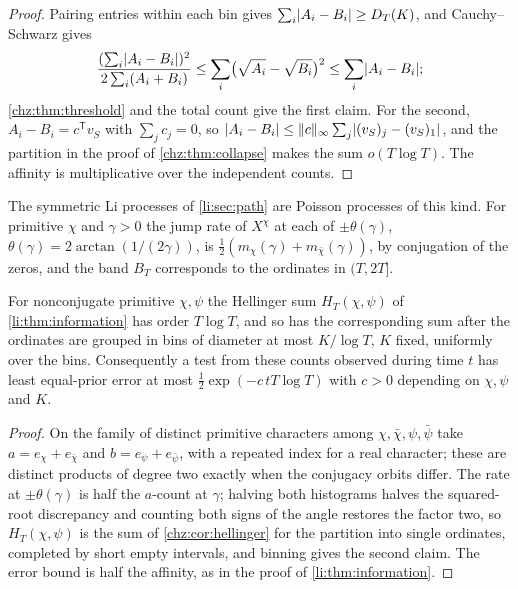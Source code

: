 \begin{proof}
Pairing entries within each bin gives $\sum_i\lvert A_i-B_i\rvert\ge D_T(K)$, and Cauchy--Schwarz gives
\[
 \frac{(\sum_i\lvert A_i-B_i\rvert)^2}{2\sum_i(A_i+B_i)}\le\sum_i\bigl(\sqrt{A_i}-\sqrt{B_i}\bigr)^2\le\sum_i\lvert A_i-B_i\rvert;
\]
\cref{chz:thm:threshold} and the total count give the first claim. For the second, $A_i-B_i=c^{\mathsf T}v_S$ with
$\sum_jc_j=0$, so $\lvert A_i-B_i\rvert\le\lVert c\rVert_\infty\sum_j\lvert(v_S)_j-(v_S)_1\rvert$, and the partition in the proof of
\cref{chz:thm:collapse} makes the sum $o(T\log T)$. The affinity is multiplicative over the independent counts.
\end{proof}

The symmetric Li processes of \cref{li:sec:path} are Poisson processes of this kind. For primitive $\chi$ and
$\gamma>0$ the jump rate of $X^\chi$ at each of $\pm\theta(\gamma)$, $\theta(\gamma)=2\arctan(1/(2\gamma))$, is
$\tfrac12(m_\chi(\gamma)+m_{\bar\chi}(\gamma))$, by conjugation of the zeros, and the band $B_T$ corresponds to the ordinates
in $(T,2T]$.

\begin{corollary}\label{chz:cor:lihellinger}
For nonconjugate primitive $\chi,\psi$ the Hellinger sum $H_T(\chi,\psi)$ of \cref{li:thm:information} has order
$T\log T$, and so has the corresponding sum after the ordinates are grouped in bins of diameter at most $K/\log T$,
$K$ fixed, uniformly over the bins. Consequently a test from these counts observed during time $t$ has least
equal-prior error at most $\tfrac12\exp(-c\,tT\log T)$ with $c>0$ depending on $\chi,\psi$ and $K$.
\end{corollary}

\begin{proof}
On the family of distinct primitive characters among $\chi,\bar\chi,\psi,\bar\psi$ take $a=e_\chi+e_{\bar\chi}$ and
$b=e_\psi+e_{\bar\psi}$, with a repeated index for a real character; these are distinct products of degree two
exactly when the conjugacy orbits differ. The rate at $\pm\theta(\gamma)$ is half the $a$-count at $\gamma$; halving both
histograms halves the squared-root discrepancy and counting both signs of the angle restores the factor two, so
$H_T(\chi,\psi)$ is the sum of \cref{chz:cor:hellinger} for the partition into single ordinates, completed by short
empty intervals, and binning gives the second claim. The error bound is half the affinity, as in the proof of
\cref{li:thm:information}.
\end{proof}

